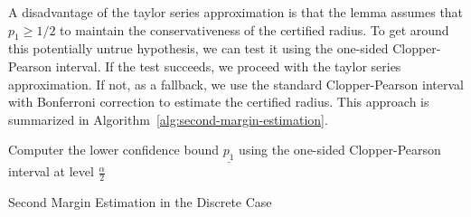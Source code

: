 A disadvantage of the taylor series approximation is that the lemma assumes that $p_1\geq1/2$ to maintain the conservativeness of the certified radius.
To get around this potentially untrue hypothesis, we can test it using the one-sided Clopper-Pearson interval.
If the test succeeds, we proceed with the taylor series approximation.
If not, as a fallback, we use the standard Clopper-Pearson interval with Bonferroni correction to estimate the certified radius.
This approach is summarized in Algorithm~\ref{alg:second-margin-estimation}.
\begin{algorithm}[h]
    \DontPrintSemicolon %
    Computer the lower confidence bound $\underline{p_1}$ using the one-sided Clopper-Pearson interval at level $\frac{\alpha}{2}$\;
    \caption{Second Margin Estimation in the Discrete Case}\label{alg:second-margin-estimation}
\end{algorithm}
